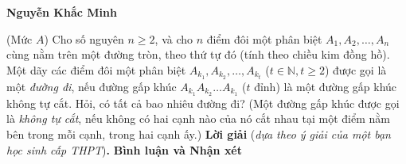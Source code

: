 \begin{multicols}{2}
	\begin{flushright}
		\textbf{\color{thachthuctoanhoc}Nguyễn Khắc Minh}
	\end{flushright}
	{}
	(Mức $A$) Cho số nguyên $n \ge 2$, và cho $n$ điểm đôi một phân biệt  $A_1, A_2, \ldots, A_n$   cùng nằm trên một đường tròn, theo thứ tự đó (tính theo chiều kim đồng hồ). Một dãy các điểm đôi một phân biệt  $A_{k_1}, A_{k_2}, \ldots, A_{k_t}$ ($t \in \mathbb{N}, t \ge 2$) được gọi là một \textit{đường đi}, nếu đường gấp khúc $A_{k_1}A_{k_2}\ldots A_{k_1}$ ($t$ đỉnh) là một đường gấp khúc không tự cắt. Hỏi, có tất cả bao nhiêu đường đi?
	\vskip 0.05cm
	(Một đường gấp khúc được gọi là \textit{không tự cắt}, nếu không có hai cạnh nào của nó cắt nhau tại một điểm nằm bên trong mỗi cạnh, trong hai cạnh ấy.)
	\vskip 0.05cm
	\textbf{\color{thachthuctoanhoc}Lời giải} (\textit{dựa theo ý giải của một bạn học sinh cấp THPT})\textbf{\color{thachthuctoanhoc}.}
	\vskip 0.05cm
	\textbf{\color{thachthuctoanhoc}Bình luận và Nhận xét}
	

\end{multicols}

